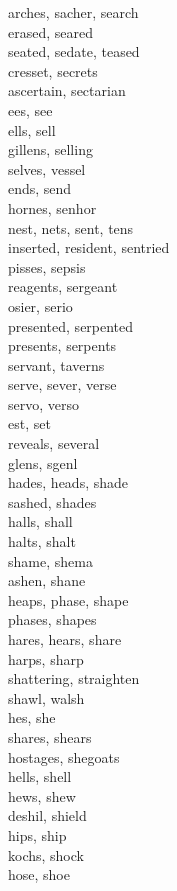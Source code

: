 arches, sacher, search\\
erased, seared\\
seated, sedate, teased\\
cresset, secrets\\
ascertain, sectarian\\
ees, see\\
ells, sell\\
gillens, selling\\
selves, vessel\\
ends, send\\
hornes, senhor\\
nest, nets, sent, tens\\
inserted, resident, sentried\\
pisses, sepsis\\
reagents, sergeant\\
osier, serio\\
presented, serpented\\
presents, serpents\\
servant, taverns\\
serve, sever, verse\\
servo, verso\\
est, set\\
reveals, several\\
glens, sgenl\\
hades, heads, shade\\
sashed, shades\\
halls, shall\\
halts, shalt\\
shame, shema\\
ashen, shane\\
heaps, phase, shape\\
phases, shapes\\
hares, hears, share\\
harps, sharp\\
shattering, straighten\\
shawl, walsh\\
hes, she\\
shares, shears\\
hostages, shegoats\\
hells, shell\\
hews, shew\\
deshil, shield\\
hips, ship\\
kochs, shock\\
hose, shoe\\
